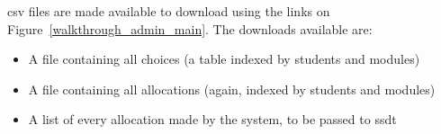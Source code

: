\Gls{csv} files are made available to download using the links on
Figure~\ref{walkthrough_admin_main}. The downloads available are:

\begin{itemize}
  \item A file containing all choices (a table indexed by students and modules)
  \item A file containing all allocations (again, indexed by students and modules)
  \item A list of every allocation made by the system, to be passed to \gls{ssdt}
\end{itemize}
